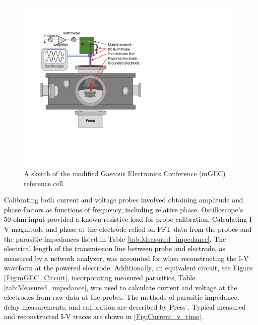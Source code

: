 \documentclass[12pt]{iopart}
\begin{document}
\begin{figure}[ht!]
\begin{center}
\includegraphics[width=.89\textwidth]{mGEC.pdf}
	\caption{A sketch of the modified Gaseous Electronics Conference (mGEC) reference cell\cite{goeckner2004modified}.}
	\label{Fig:mGEC}
\end{center}
\end{figure}

\textcolor{black}{Calibrating both current and voltage probes involved obtaining amplitude and phase factors as functions of frequency, including relative phase. Oscilloscope's 50-ohm input provided a known resistive load for probe calibration. Calculating I-V magnitude and phase at the electrode relied on FFT data from the probes and the parasitic impedances listed in Table \ref{tab:Measured_impedance}. The electrical length of the transmission line between probe and electrode, as measured by a network analyzer, was accounted for when reconstructing the I-V waveform at the powered electrode. Additionally, an equivalent circuit, see Figure \ref{Fig:mGEC_Circuit}, incorporating measured parasitics, Table \ref{tab:Measured_impedance}, was used to calculate current and voltage at the electrodes from raw data at the probes. The methods of parasitic impedance, delay measurements, and calibration are described by Press \cite{press2019sub}. Typical measured and reconstructed I-V traces are shown in \ref{Fig:Current_v_time}.}
\end{document}

